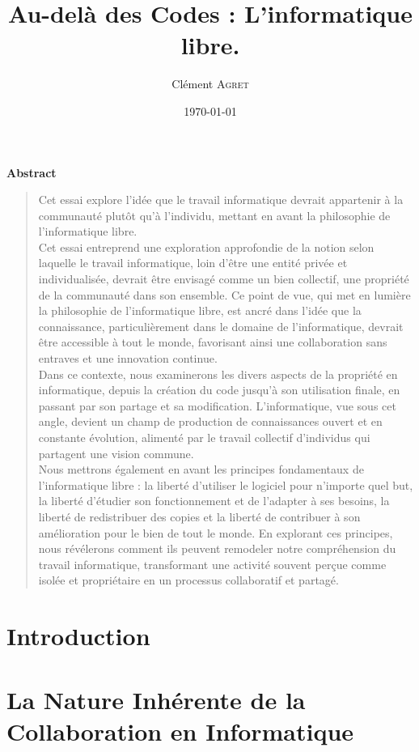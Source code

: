 \documentclass[10pt]{book}
\title{Au-delà des Codes  : L'informatique libre.}
\author{Clément \textsc{Agret}}
\date{\today}
\begin{document}
\maketitle
\begin{center}
\large \textbf{Abstract}
\end{center}

\begin{quotation}
Cet essai explore l'idée que le travail informatique devrait appartenir à la communauté plutôt qu'à l'individu, mettant en avant la philosophie de l'informatique libre.\\
Cet essai entreprend une exploration approfondie de la notion selon laquelle le travail informatique, loin d'être une entité privée et individualisée, devrait être envisagé comme un bien collectif, une propriété de la communauté dans son ensemble. Ce point de vue, qui met en lumière la philosophie de l'informatique libre, est ancré dans l'idée que la connaissance, particulièrement dans le domaine de l'informatique, devrait être accessible à tout le monde, favorisant ainsi une collaboration sans entraves et une innovation continue.\\

Dans ce contexte, nous examinerons les divers aspects de la propriété en informatique, depuis la création du code jusqu'à son utilisation finale, en passant par son partage et sa modification. L'informatique, vue sous cet angle, devient un champ de production de connaissances ouvert et en constante évolution, alimenté par le travail collectif d'individus qui partagent une vision commune.\\

Nous mettrons également en avant les principes fondamentaux de l'informatique libre : la liberté d'utiliser le logiciel pour n'importe quel but, la liberté d'étudier son fonctionnement et de l'adapter à ses besoins, la liberté de redistribuer des copies et la liberté de contribuer à son amélioration pour le bien de tout le monde. En explorant ces principes, nous révélerons comment ils peuvent remodeler notre compréhension du travail informatique, transformant une activité souvent perçue comme isolée et propriétaire en un processus collaboratif et partagé.
\end{quotation}

\newpage
\chapter*{Introduction}

\chapter{La Nature Inhérente de la Collaboration en Informatique}

\end{document}
